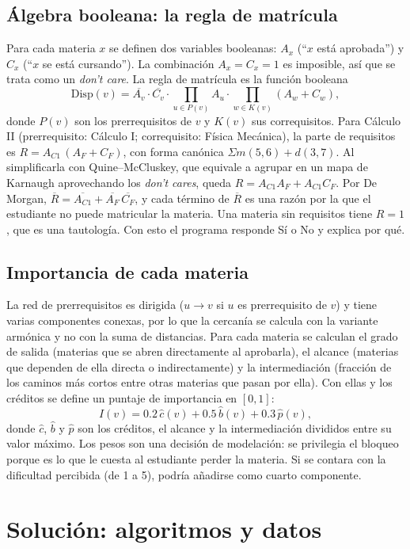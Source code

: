 \documentclass[11pt,a4paper]{article}
\begin{document}
\subsection{Álgebra booleana: la regla de matrícula}
\label{sec:booleano}
Para cada materia $x$ se definen dos variables booleanas: $A_x$ (``$x$ está aprobada'') y $C_x$ (``$x$ se está cursando''). La combinación $A_x=C_x=1$ es imposible, así que se trata como un \emph{don't care}. La regla de matrícula es la función booleana
\[
\mathrm{Disp}(v)=\overline{A_v}\cdot\overline{C_v}\cdot\prod_{u\in P(v)}A_u\cdot\prod_{w\in K(v)}(A_w+C_w),
\]
donde $P(v)$ son los prerrequisitos de $v$ y $K(v)$ sus correquisitos. Para Cálculo II (prerrequisito: Cálculo I; correquisito: Física Mecánica), la parte de requisitos es $R=A_{C1}\,(A_{F}+C_{F})$, con forma canónica $\Sigma m(5,6)+d(3,7)$. Al simplificarla con Quine--McCluskey, que equivale a agrupar en un mapa de Karnaugh aprovechando los \emph{don't cares}, queda $R=A_{C1}A_{F}+A_{C1}C_{F}$. Por De Morgan, $\overline{R}=\overline{A_{C1}}+\overline{A_{F}}\,\overline{C_{F}}$, y cada término de $\overline{R}$ es una razón por la que el estudiante no puede matricular la materia. Una materia sin requisitos tiene $R=1$, que es una tautología. Con esto el programa responde Sí o No y explica por qué.

\subsection{Importancia de cada materia}
\label{sec:importancia}
La red de prerrequisitos es dirigida ($u\to v$ si $u$ es prerrequisito de $v$) y tiene varias componentes conexas, por lo que la cercanía se calcula con la variante armónica y no con la suma de distancias. Para cada materia se calculan el grado de salida (materias que se abren directamente al aprobarla), el alcance (materias que dependen de ella directa o indirectamente) y la intermediación (fracción de los caminos más cortos entre otras materias que pasan por ella). Con ellas y los créditos se define un puntaje de importancia en $[0,1]$:
\[
I(v)=0.2\,\hat c(v)+0.5\,\hat b(v)+0.3\,\hat p(v),
\]
donde $\hat c$, $\hat b$ y $\hat p$ son los créditos, el alcance y la intermediación divididos entre su valor máximo. Los pesos son una decisión de modelación: se privilegia el bloqueo porque es lo que le cuesta al estudiante perder la materia. Si se contara con la dificultad percibida (de 1 a 5), podría añadirse como cuarto componente.

\section{Solución: algoritmos y datos}
\end{document}
